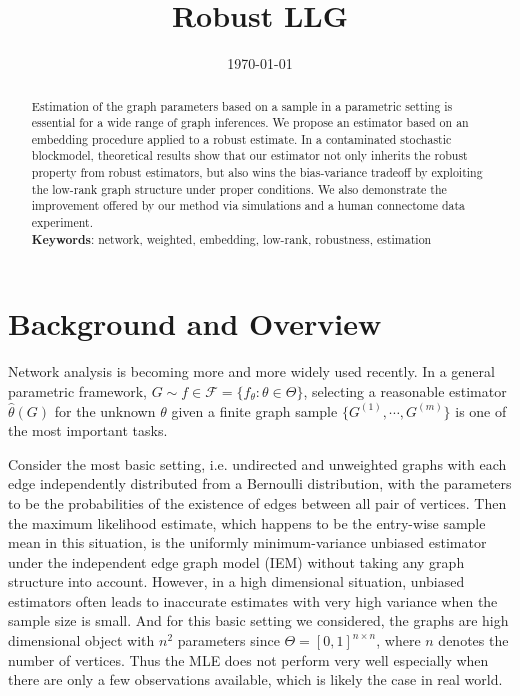 \documentclass[a4paper]{article}
\title{Robust LLG}
\date{\today}
\renewcommand{\hat}{\widehat}
\begin{document}
\maketitle

\begin{abstract}

Estimation of the graph parameters based on a sample in a parametric setting is essential for a wide range of graph inferences. We propose an estimator based on an embedding procedure applied to a robust estimate. In a contaminated stochastic blockmodel, theoretical results show that our estimator not only inherits the robust property from robust estimators, but also wins the bias-variance tradeoff by exploiting the low-rank graph structure under proper conditions. We also demonstrate the improvement offered by our method via simulations and a human connectome data experiment. \\
{\bf Keywords}: network, weighted, embedding, low-rank, robustness, estimation
\end{abstract}

\section{Background and Overview}

Network analysis is becoming more and more widely used recently. In a general parametric framework, $G \sim f \in \mathcal{F} = \{f_{\theta} : \theta \in \Theta \}$, selecting a reasonable estimator $\hat{\theta}(G)$ for the unknown $\theta$ given a finite graph sample $\{G^{(1)}, \cdots, G^{(m)}\}$ is one of the most important tasks.

Consider the most basic setting, i.e. undirected and unweighted graphs with each edge independently distributed from a Bernoulli distribution, with the parameters to be the probabilities of the existence of edges between all pair of vertices.
Then the maximum likelihood estimate, which happens to be the entry-wise sample mean in this situation, is the uniformly minimum-variance unbiased estimator under the independent edge graph model (IEM) \citep{bollobas2007phase} without taking any graph structure into account. 
However, in a high dimensional situation, unbiased estimators often leads to inaccurate estimates with very high variance when the sample size is small. And for this basic setting we considered, the graphs are high dimensional object with $n^2$ parameters since $\Theta = [0, 1]^{n\times n}$, where $n$ denotes the number of vertices. Thus the MLE does not perform very well especially when there are only a few observations available, which is likely the case in real world.
\end{document}
